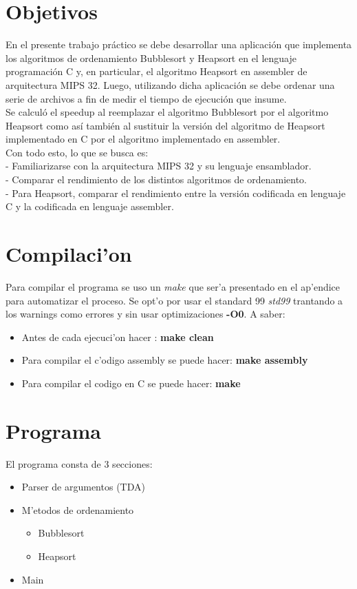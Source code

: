\documentclass[a4paper,11pt]{article}
\begin{document}
\section{Objetivos}
En el presente trabajo pr\'actico se debe desarrollar una aplicaci\'on que implementa los algoritmos de ordenamiento Bubblesort y Heapsort en el lenguaje programaci\'on C y, en particular, el algoritmo Heapsort en assembler de arquitectura MIPS 32. Luego, utilizando dicha aplicaci\'on se debe ordenar  una serie de archivos a fin de medir el tiempo de ejecuci\'on que insume.\\
Se calcul\'o el  speedup al reemplazar el  algoritmo Bubblesort por el algoritmo Heapsort como as\'i tambi\'en al sustituir la versi\'on del algoritmo de Heapsort implementado en C por el algoritmo implementado en assembler.\\
Con todo esto, lo que se busca es: \\
- Familiarizarse con la arquitectura MIPS 32 y su lenguaje ensamblador.\\
- Comparar el rendimiento de los distintos algoritmos de ordenamiento.\\
- Para Heapsort, comparar el rendimiento entre la versi\'on codificada en lenguaje C y la codificada en lenguaje assembler.

\section{Compilaci'on}
Para compilar el programa se uso un \textit{make} que ser'a presentado en el ap'endice para automatizar el proceso. Se opt'o por usar el standard 99 \textit{std99}\cite{std99} trantando a los warnings como errores y sin usar optimizaciones {\bf -O0}.
A saber: 
\begin{itemize}
 \item Antes de cada ejecuci'on hacer : {\bf make clean}
 \item Para compilar el c'odigo assembly se puede hacer: {\bf make assembly}
 \item Para compilar el codigo en C se puede hacer: {\bf make}
\end{itemize}


\section{Programa}
El programa consta de 3 secciones:
\begin{itemize}
 \item Parser de argumentos (TDA)
 \item M'etodos de ordenamiento
 \begin{itemize}
  \item Bubblesort
  \item Heapsort
 \end{itemize}
 \item Main
\end{itemize}
\end{document}
